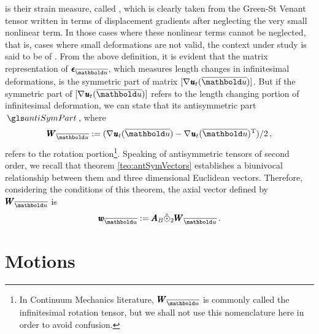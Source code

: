 is their strain measure, called , which is clearly taken from the Green-St Venant tensor written in terms of displacement gradients after neglecting the very small nonlinear term. In those cases where these nonlinear terms cannot be neglected, that is, cases where small deformations are not valid, the context under study is said to be of . From the above definition, it is evident that the matrix representation of $\tnr{\epsilon}_{\overline{\vto{u}}}$, which measures length changes in infinitesimal deformations, is the symmetric part of matrix $[\fua{\nabla\tnr{\mathit{u}}_t}{\overline{\vto{u}}}]$. But if the symmetric part of $[\fua{\nabla\tnr{\mathit{u}}_t}{\overline{\vto{u}}}]$ refers to the length changing portion of infinitesimal deformation, we can state that its antisymmetric part $\gloref{antiSymPart}$, where
\begin{equation}\label{eq:infinitRotation}
\tnr{W}_{\overline{\vto{u}}}:=(\fua{\nabla\tnr{\mathit{u}}_t}{\overline{\vto{u}}}-\fua{\nabla\tnr{\mathit{u}}_t}{\overline{\vto{u}}}^{\text{T}})/2\,,
\end{equation}
refers to the rotation portion\footnote{In Continuum Mechanics literature, $\tnr{W}_{\overline{\vto{u}}}$ is commonly called the infinitesimal rotation tensor, but we shall not use this nomenclature here in order to avoid confusion.}. Speaking of antisymmetric tensors of second order, we recall that theorem \ref{teo:antSymVectors} establishes a biunivocal relationship between them and three dimensional Euclidean vectors. Therefore, considering the conditions of this theorem, the axial vector defined by $\tnr{W}_{\overline{\vto{u}}}$ is  
\begin{equation}\label{eq:vectinfinitRotation}
\tnr{\mathit{w}}_{\overline{\vto{u}}}:=\tnr{A}_B\hat{\odot}_2 \tnr{W}_{\overline{\vto{u}}}\,.
\end{equation}


\section{Motions}

